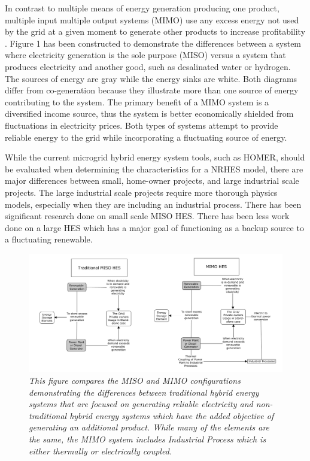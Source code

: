 \documentclass{article}                                                                           %
\begin{document}
\begin{linenumbers}
In contrast to multiple means of energy generation producing one product, multiple input multiple output systems (MIMO) use any excess energy not used by the grid at a given moment to generate other products to increase profitability \cite {Garcia2013}. Figure 1 has been constructed to demonstrate the differences between a system where electricity generation is the sole purpose (MISO) versus a system that produces electricity and another good, such as desalinated water or hydrogen. The sources of energy are gray while the energy sinks are white. Both diagrams differ from co-generation because they illustrate more than one source of energy contributing to the system. The primary benefit of a MIMO system is a diversified income source, thus the system is better economically shielded from fluctuations in electricity prices. Both types of systems attempt to provide reliable energy to the grid while incorporating a fluctuating source of energy.

 While the current microgrid hybrid energy system tools, such as HOMER, should be evaluated when determining the characteristics for a NRHES model, there are major differences between small, home-owner projects, and large industrial scale projects. The large industrial scale projects require more thorough physics models, especially when they are including an industrial process. There has been significant research done on small scale MISO HES.  There has been less work done on a large HES which has a major goal of functioning as a backup source to a fluctuating renewable.

\begin{figure}
\includegraphics[width=\textwidth]{MISO_MIMO.png}
\caption{\small \sl This figure compares the MISO and MIMO configurations demonstrating the differences between traditional hybrid energy systems that are focused on generating reliable electricity and non-traditional hybrid energy systems which have the added objective of generating an additional product.  While many of the elements are the same, the MIMO system includes  Industrial Process which is either thermally or electrically coupled.}
\end{figure}


\end{linenumbers}
\end{document}

